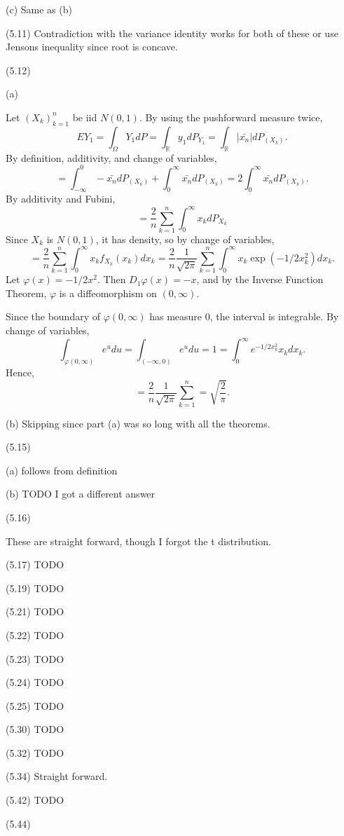 \documentclass[12pt, reqno]{amsart}
\numberwithin{equation}{section}
\newcommand{\R}{\mathbb{R}}
\let\phi\varphi
\newcommand{\mean}{\bar}
\begin{document}
(c) Same as (b)

(5.11)
Contradiction with the variance identity works for both of these or use Jensons inequality since root is concave.

(5.12)

(a)

Let $(X_k)_{k = 1}^n$ be iid $N(0, 1).$
By using the pushforward measure twice,
\[
E Y_1
= \int_{\Omega} Y_1 dP
= \int_{\R} y_1 dP_{Y_1}
= \int_{\R} | \mean{x_n} | dP_{(X_k)}.
\]
By definition, additivity, and change of variables,
\[
= \int_{-\infty}^0 -\mean{x_n} dP_{(X_k)} + \int_0^{\infty} \mean{x_n} dP_{(X_k)}
= 2 \int_0^{\infty} \mean{x_n} dP_{(X_k)}.
\]
By additivity and Fubini,
\[
=  \frac{2}{n} \sum_{k = 1}^n \int_0^{\infty} x_k dP_{X_k}
\]
Since $X_k$ is $N(0, 1)$, it has density, so by change of variables,
\[
=  \frac{2}{n} \sum_{k = 1}^n \int_0^{\infty} x_k f_{X_k}(x_k) dx_k 
=  \frac{2}{n} \frac{1}{\sqrt{2 \pi}} \sum_{k = 1}^n \int_0^{\infty} x_k \exp(-1/2 x_k^2) dx_k.
\]
Let $\phi(x) = -1/2 x^2$. Then $D_1 \phi(x) = -x$, and by the Inverse Function Theorem, $\phi$ is a diffeomorphism on $(0, \infty)$.

Since the boundary of $\phi(0, \infty)$ has measure 0, the interval is integrable. By change of variables,
\[
\int_{\phi(0, \infty)} e^{u} du
= \int_{(-\infty, 0)} e^{u} du
= 1
= \int_0^\infty e^{-1/2 x_k^2} x_k dx_k.
\]
Hence,
\[
=  \frac{2}{n} \frac{1}{\sqrt{2 \pi}} \sum_{k = 1}^n
= \sqrt{\frac{2}{\pi}}.
\]

(b) Skipping since part (a) was so long with all the theorems.

(5.15)

(a) follows from definition

(b) TODO I got a different answer

(5.16)

These are straight forward, though I forgot the t distribution.

(5.17)
TODO

(5.19)
TODO

(5.21)
TODO

(5.22)
TODO

(5.23)
TODO

(5.24)
TODO

(5.25)
TODO

(5.30)
TODO

(5.32)
TODO

(5.34)
Straight forward.

(5.42)
TODO

(5.44)
\end{document}
